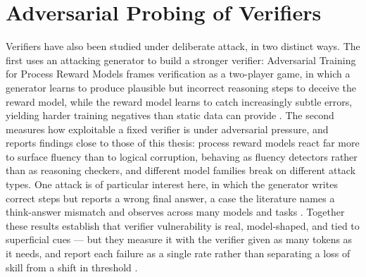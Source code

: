 \documentclass[12pt, a4paper, oneside]{report}
\begin{document}
\section{Adversarial Probing of Verifiers}  
Verifiers have also been studied under deliberate attack, in two distinct ways. The first uses an attacking generator to build a stronger verifier: Adversarial Training for Process Reward Models frames verification as a two-player game, in which a generator learns to produce plausible but incorrect reasoning steps to deceive the reward model, while the reward model learns to catch increasingly subtle errors, yielding harder training negatives than static data can provide \parencite{Juneja2025}. The second measures how exploitable a fixed verifier is under adversarial pressure, and reports findings close to those of this thesis: process reward models react far more to surface fluency than to logical corruption, behaving as fluency detectors rather than as reasoning checkers, and different model families break on different attack types. One attack is of particular interest here, in which the generator writes correct steps but reports a wrong final answer, a case the literature names a think-answer mismatch and observes across many models and tasks \parencite{Shen2025}. Together these results establish that verifier vulnerability is real, model-shaped, and tied to superficial cues — but they measure it with the verifier given as many tokens as it needs, and report each failure as a single rate rather than separating a loss of skill from a shift in threshold \parencite{Juneja2025}.
\end{document}

